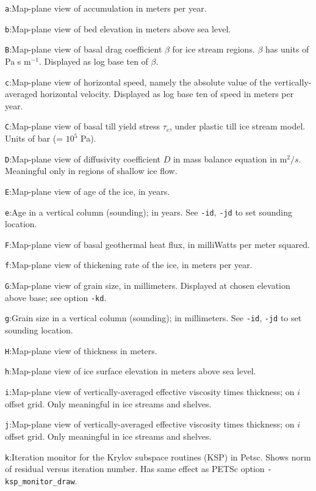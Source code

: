 \documentclass[11pt,final]{amsart}
\begin{document}
\verb|a|:\quad Map-plane view of accumulation in meters per year.

\verb|b|:\quad Map-plane view of bed elevation in meters above sea level.

\verb|B|:\quad Map-plane view of basal drag coefficient $\beta$ for ice stream regions.  $\beta$ has units of Pa s $\text{m}^{-1}$.  Displayed as log base ten of $\beta$.

\verb|c|:\quad Map-plane view of horizontal speed, namely the absolute value of the vertically-averaged horizontal velocity.  Displayed as log base ten of speed in meters per year.

\verb|C|:\quad Map-plane view of basal till yield stress $\tau_c$, under plastic till ice stream model.  Units of bar (= $10^5$ Pa).

\verb|D|:\quad Map-plane view of diffusivity coefficient $D$ in mass balance equation in $\text{m}^2/s$.  Meaningful only in regions of shallow ice flow.

\verb|E|:\quad Map-plane view of age of the ice, in years.

\verb|e|:\quad Age in a vertical column (sounding); in years.  See \verb|-id|, \verb|-jd| to set sounding location.

\verb|F|:\quad Map-plane view of basal geothermal heat flux, in milliWatts per meter squared.

\verb|f|:\quad Map-plane view of thickening rate of the ice, in meters per year.

\verb|G|:\quad Map-plane view of grain size, in millimeters.  Displayed at chosen elevation above base; see option \verb|-kd|.

\verb|g|:\quad Grain size in a vertical column (sounding); in millimeters.  See \verb|-id|, \verb|-jd| to set sounding location.

\verb|H|:\quad Map-plane view of thickness in meters.

\verb|h|:\quad Map-plane view of ice surface elevation in meters above sea level.

\verb|i|:\quad Map-plane view of vertically-averaged effective viscosity times thickness; on $i$ offset grid.  Only meaningful in ice streams and shelves.

\verb|j|:\quad Map-plane view of vertically-averaged effective viscosity times thickness; on $i$ offset grid.  Only meaningful in ice streams and shelves.

\verb|k|:\quad Iteration monitor for the Krylov subspace routines (KSP) in Petsc.  Shows norm of residual versus iteration number.  Has same effect as PETSc option \verb|-ksp_monitor_draw|.
\end{document}
